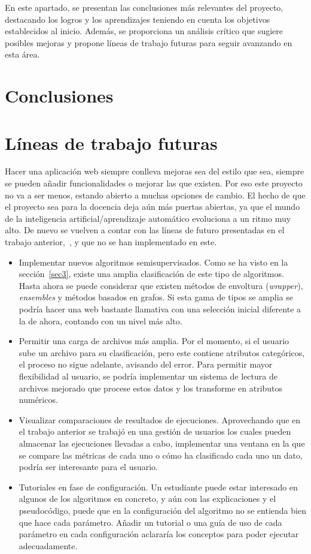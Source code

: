 
En este apartado, se presentan las conclusiones más relevantes del proyecto, destacando los logros y los aprendizajes teniendo en cuenta los objetivos establecidos al inicio. Además, se proporciona un análisis crítico que sugiere posibles mejoras y propone líneas de trabajo futuras para seguir avanzando en esta área.

\section{Conclusiones}

\section{Líneas de trabajo futuras}
Hacer una aplicación web siempre conlleva mejoras sea del estilo que sea, siempre se pueden añadir funcionalidades o mejorar las que existen. Por eso este proyecto no va a ser menos, estando abierto a muchas opciones de cambio. El hecho de que el proyecto sea para la docencia deja aún más puertas abiertas, ya que el mundo de la inteligencia artificial/aprendizaje automático evoluciona a un ritmo muy alto. De nuevo se vuelven a contar con las líneas de futuro presentadas en el trabajo anterior,~\cite{TFG:David}, y que no se han implementado en este.

\begin{itemize}
	\item Implementar nuevos algoritmos semisupervisados. Como se ha visto en la sección~\ref{sec3}, existe una amplia clasificación de este tipo de algoritmos. Hasta ahora se puede considerar que existen métodos de envoltura (\textit{wrapper}), \textit{ensembles} y métodos basados en grafos. Si esta gama de tipos se amplia se podría hacer una web bastante llamativa con una selección inicial diferente a la de ahora, contando con un nivel más alto.
	\item Permitir una carga de archivos más amplia. Por el momento, si el usuario sube un archivo para su clasificación, pero este contiene atributos categóricos, el proceso no sigue adelante, avisando del error. Para permitir mayor flexibilidad al usuario, se podría implementar un sistema de lectura de archivos mejorado que procese estos datos y los transforme en atributos numéricos.
	\item Visualizar comparaciones de resultados de ejecuciones. Aprovechando que en el trabajo anterior se trabajó en una gestión de usuarios los cuales pueden almacenar las ejecuciones llevadas a cabo, implementar una ventana en la que se compare las métricas de cada uno o cómo ha clasificado cada uno un dato, podría ser interesante para el usuario.
	\item Tutoriales en fase de configuración. Un estudiante puede estar interesado en algunos de los algoritmos en concreto, y aún con las explicaciones y el pseudocódigo, puede que en la configuración del algoritmo no se entienda bien que hace cada parámetro. Añadir un tutorial o una guía de uso de cada parámetro en cada configuración aclararía los conceptos para poder ejecutar adecuadamente.
	
	
\end{itemize}